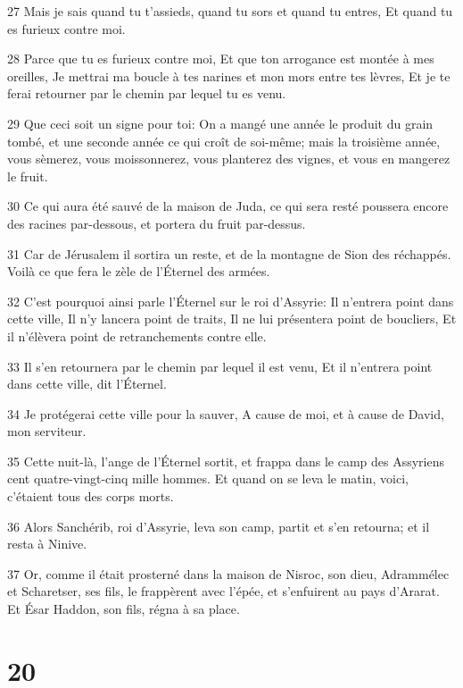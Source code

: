 \par 27 Mais je sais quand tu t'assieds, quand tu sors et quand tu entres, Et quand tu es furieux contre moi.
\par 28 Parce que tu es furieux contre moi, Et que ton arrogance est montée à mes oreilles, Je mettrai ma boucle à tes narines et mon mors entre tes lèvres, Et je te ferai retourner par le chemin par lequel tu es venu.
\par 29 Que ceci soit un signe pour toi: On a mangé une année le produit du grain tombé, et une seconde année ce qui croît de soi-même; mais la troisième année, vous sèmerez, vous moissonnerez, vous planterez des vignes, et vous en mangerez le fruit.
\par 30 Ce qui aura été sauvé de la maison de Juda, ce qui sera resté poussera encore des racines par-dessous, et portera du fruit par-dessus.
\par 31 Car de Jérusalem il sortira un reste, et de la montagne de Sion des réchappés. Voilà ce que fera le zèle de l'Éternel des armées.
\par 32 C'est pourquoi ainsi parle l'Éternel sur le roi d'Assyrie: Il n'entrera point dans cette ville, Il n'y lancera point de traits, Il ne lui présentera point de boucliers, Et il n'élèvera point de retranchements contre elle.
\par 33 Il s'en retournera par le chemin par lequel il est venu, Et il n'entrera point dans cette ville, dit l'Éternel.
\par 34 Je protégerai cette ville pour la sauver, A cause de moi, et à cause de David, mon serviteur.
\par 35 Cette nuit-là, l'ange de l'Éternel sortit, et frappa dans le camp des Assyriens cent quatre-vingt-cinq mille hommes. Et quand on se leva le matin, voici, c'étaient tous des corps morts.
\par 36 Alors Sanchérib, roi d'Assyrie, leva son camp, partit et s'en retourna; et il resta à Ninive.
\par 37 Or, comme il était prosterné dans la maison de Nisroc, son dieu, Adrammélec et Scharetser, ses fils, le frappèrent avec l'épée, et s'enfuirent au pays d'Ararat. Et Ésar Haddon, son fils, régna à sa place.

\chapter{20}

